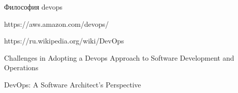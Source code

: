

\begin{enumerate}[{label=[\arabic{*}]}]

\item Философия devops
    \label{book:Effective Devops}

\item https://aws.amazon.com/devops/
    \label{site:aws.amazon.com/devops}

\item https://ru.wikipedia.org/wiki/DevOps
    \label{site:ru.wikipedia.org/wiki/devops}

\item Challenges in Adopting a Devops Approach to Software Development and Operations
    \label{article:Challenges in Adopting a Devops}

\item DevOps: A Software Architect's Perspective
    \label{book:DevOps: A Software Architect's Perspective}

\end{enumerate}
